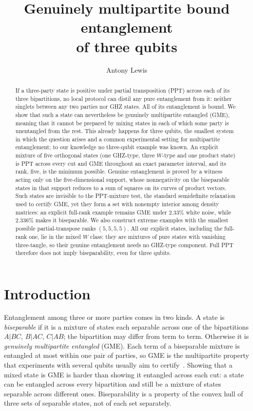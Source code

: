 \documentclass[11pt]{article}
\title{Genuinely multipartite bound entanglement\\of three qubits}
\author{Antony Lewis\\[2pt]{\small\normalfont \Sussex}}
\date{}
\theoremstyle{remark}
\begin{document}
\maketitle
\begin{abstract}
If a three-party state is positive under partial transposition (PPT) across each of its three bipartitions, no local
protocol can distil any pure entanglement from it: neither singlets between any two parties nor GHZ states. All of its
entanglement is bound. We show that such a state can nevertheless be genuinely multipartite entangled (GME), meaning
that it cannot be prepared by mixing states in each of which some party is unentangled from the rest. This already
happens for three qubits, the smallest system in which the question arises and a common experimental setting
for multipartite entanglement; to our knowledge no three-qubit example was known. An explicit mixture of five orthogonal
states (one GHZ-type, three $W$-type and one product state) is PPT across every cut and GME throughout an exact parameter interval, and its rank, five, is
the minimum possible. Genuine entanglement is proved by a witness acting only on the five-dimensional support, whose
nonnegativity on the biseparable states in that support reduces to a sum of squares on its curves of product vectors. Such
states are invisible to the PPT-mixture test, the standard semidefinite relaxation used to certify GME, yet they form
a set with nonempty interior among density matrices: an explicit full-rank example remains GME under $2.33\%$ white noise, while $2.336\%$
makes it biseparable. We also construct extreme examples with the smallest possible partial-transpose ranks
$(5,5,5,5)$. All our explicit states, including the full-rank one, lie in the mixed $W$ class: they are mixtures of pure
states with vanishing three-tangle, so their genuine entanglement needs no GHZ-type component. Full PPT therefore does not imply
biseparability, even for three qubits.
\end{abstract}

\section{Introduction}\label{sec:ppt3-intro}

Entanglement among three or more parties comes in two kinds. A state is \emph{biseparable} if it is a mixture of states
each separable across one of the bipartitions $A|BC$, $B|AC$, $C|AB$; the bipartition may differ from term to term. Otherwise it is \emph{genuinely multipartite entangled} (GME). Each term of a biseparable mixture is entangled at most within one pair of
parties, so GME is the multipartite property that experiments with several qubits usually aim to
certify~\cite{HHH09,GT09}. Showing that a mixed state is GME is harder than showing it entangled across
each cut: a state can be entangled across every bipartition and still be a mixture of states separable across
different ones. Biseparability is a property of the convex hull of three sets of separable states, not of each set
separately.
\end{document}
